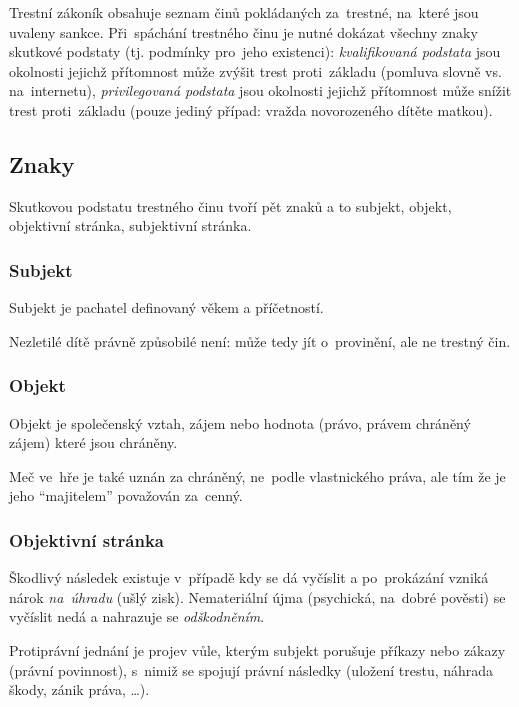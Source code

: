 Trestní zákoník obsahuje seznam činů pokládaných za~trestné, na~které jsou uvaleny sankce.
Při~spáchání trestného činu je nutné dokázat všechny znaky skutkové podstaty (tj. podmínky pro~jeho existenci):
\emph{kvalifikovaná podstata} jsou okolnosti jejichž přítomnost může zvýšit trest proti~základu (pomluva slovně vs. na~internetu),
\emph{privilegovaná podstata} jsou okolnosti jejichž přítomnost může snížit trest proti~základu (pouze jediný případ: vražda novorozeného dítěte matkou).

\subsection{Znaky}

Skutkovou podstatu trestného činu tvoří pět znaků a to subjekt, objekt, objektivní stránka, subjektivní stránka.

\subsubsection{Subjekt}

Subjekt je pachatel definovaný věkem a příčetností.

Nezletilé dítě právně způsobilé není: může tedy jít o~provinění, ale ne trestný čin.


\subsubsection{Objekt}

Objekt je společenský vztah, zájem nebo hodnota (právo, právem chráněný zájem) které jsou chráněny.

Meč ve~hře je také uznán za chráněný, ne~podle vlastnického práva, ale tím že je jeho \enquote{majitelem} považován za~cenný.


\subsubsection{Objektivní stránka}

Škodlivý následek existuje v~případě kdy se dá vyčíslit a po~prokázání vzniká nárok \emph{na~úhradu} (ušlý zisk).
Nemateriální újma (psychická, na~dobré pověsti) se vyčíslit nedá a nahrazuje se \emph{odškodněním}.

Protiprávní jednání je projev vůle, kterým subjekt porušuje příkazy nebo zákazy (právní povinnost), s~nimiž se spojují právní následky (uložení trestu, náhrada škody, zánik práva, \dots).

